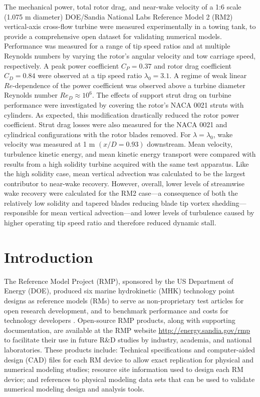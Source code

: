 \documentclass[10pt,letterpaper]{article}
\begin{document}
The mechanical power, total rotor drag, and near-wake velocity of a 1:6 scale
(1.075 m diameter) DOE/Sandia National Labs Reference Model 2 (RM2)
vertical-axis cross-flow turbine were measured experimentally in a towing tank,
to provide a comprehensive open dataset for validating numerical models.
Performance was measured for a range of tip speed ratios and at multiple
Reynolds numbers by varying the rotor's angular velocity and tow carriage speed,
respectively. A peak power coefficient $C_P = 0.37$ and rotor drag coefficient
$C_D = 0.84$ were observed at a tip speed ratio $\lambda_0 = 3.1$. A regime of
weak linear $Re$-dependence of the power coefficient was observed above a
turbine diameter Reynolds number $Re_D \approx 10^6$. The effects of support
strut drag on turbine performance were investigated by covering the rotor's NACA
0021 struts with cylinders. As expected, this modification drastically reduced
the rotor power coefficient. Strut drag losses were also measured for the NACA
0021 and cylindrical configurations with the rotor blades removed. For
$\lambda=\lambda_0$, wake velocity was measured at 1 m $(x/D=0.93)$ downstream.
Mean velocity, turbulence kinetic energy, and mean kinetic energy transport were
compared with results from a high solidity turbine acquired with the same test
apparatus. Like the high solidity case, mean vertical advection was calculated
to be the largest contributor to near-wake recovery. However, overall, lower
levels of streamwise wake recovery were calculated for the RM2 case---a
consequence of both the relatively low solidity and tapered blades reducing
blade tip vortex shedding---responsible for mean vertical advection---and lower
levels of turbulence caused by higher operating tip speed ratio and therefore
reduced dynamic stall.


\section*{Introduction}

The Reference Model Project (RMP), sponsored by the US Department of Energy
(DOE), produced six marine hydrokinetic (MHK) technology point designs as
reference models (RMs) to serve as non-proprietary test articles for open
research development, and to benchmark performance and costs for technology
developers \cite{Neary2014, Neary2014a}. Open-source RMP products, along with
supporting documentation, are available at the RMP website
\url{http://energy.sandia.gov/rmp} to facilitate their use in future R\&D
studies by industry, academia, and national laboratories. These products
include: Technical specifications and computer-aided design (CAD) files for each
RM device to allow exact replication for physical and numerical modeling
studies; resource site information used to design each RM device; and references
to physical modeling data sets that can be used to validate numerical modeling
design and analysis tools.
\end{document}
